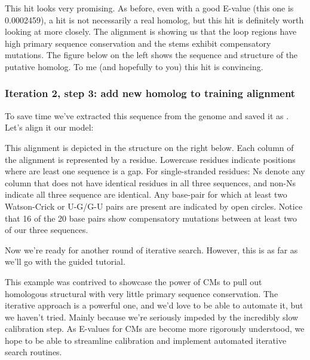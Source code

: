 This hit looks very promising. As before, even with a good E-value
(this one is 0.0002459), a hit is not necessarily a real homolog, but
this hit is definitely worth looking at more closely. The
 alignment is showing us that the loop regions have
high primary sequence conservation and the stems exhibit
compensatory mutations. The figure below on the left shows the
sequence and structure of the putative homolog. To me (and hopefully to you) this
hit is convincing. 

\subsubsection{Iteration 2, step 3: add new homolog to training alignment}
To save time we've extracted this sequence from the genome and saved
it as . Let's align it our model:


This alignment is depicted in the structure on the right
below. Each column of the alignment is represented by a
residue. Lowercase residues indicate positions where are least one
sequence is a gap.  For single-stranded residues: Ns denote any
column that does  not have identical residues in all three sequences,
and non-Ns indicate all three sequence are identical. Any base-pair
for which at least two Watson-Crick or U-G/G-U pairs are present are
indicated by open circles. Notice that 16 of the 20 base pairs show
compensatory mutations between at least two of our three sequences. 

Now we're ready for another round of iterative search. However, this
is as far as we'll go with the guided tutorial. 

This example was contrived to showcase the power of CMs to pull out
homologous structural with very little primary sequence
conservation. The iterative approach is a powerful one, and we'd love
to be able to automate it, but we haven't tried. Mainly because we're
seriously impeded by the incredibly slow calibration step. As E-values
for CMs are become more rigorously understood, we hope to be able to
streamline calibration and implement automated iterative search
routines. 

